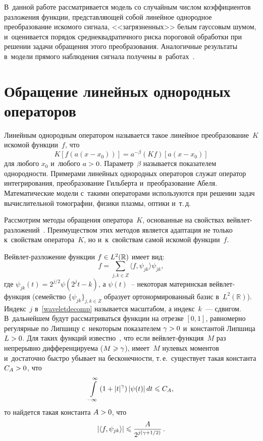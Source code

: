 \begin{multicols}{2}
 В~данной работе рассматривается модель со случайным числом коэффициентов 
 разложения функции, представляющей собой линейное однородное преобразование 
 искомого сигнала, <<загрязненных>> белым гауссовым шумом, и~оценивается 
 порядок среднеквадратичного риска пороговой обработки при решении задачи 
 обращения этого преобразования. Аналогичные результаты в~модели прямого 
 наблюдения сигнала получены в~работах~\cite{SH18, SH19}.


\section{Обращение линейных однородных операторов}

Линейным однородным оператором называется такое линейное преобразование~$K$ 
искомой функции~$f$, что
$$
K\left[f\left(a\left(x-x_0\right)\right)\right]=a^{-\beta}(Kf)\left[a\left(x-x_0\right)\right]
$$
для любого $x_0$ и~любого $a\hm>0$. Параметр~$\beta$ называется показателем 
однородности. Примерами линейных однородных операторов служат оператор 
интегрирования, преобразование Гильберта и~преобразование Абеля. 
Математические модели с~такими операторами используются при решении 
задач вычислительной томографии, физики плазмы, оптики и~т.\,д.

Рассмотрим методы обращения оператора~$K$, основанные на свойствах 
вейв\-лет-раз\-ло\-же\-ний~\cite{D94, AS98}. Преимуществом этих методов 
является адап\-та\-ция не только к~свойствам оператора~$K$, но и~к~свойствам самой 
искомой функции~$f$.

Вейвлет-разложение функции $f\hm\in L^2(\mathbb{R})$ имеет вид:
\begin{equation}                                                              
\label{waveletdecomp}
f = \sum\limits_{j,k\in Z} \langle f,\psi_{jk}\rangle  \psi_{jk},
\end{equation}
где $\psi_{jk}(t)=2^{j/2}\psi(2^jt-k)$, а $\psi(t)$~-- 
некоторая материнская вейв\-лет-функ\-ция (семейство $\{\psi_{jk}\}_{j,k\in Z}$ 
образует ортонормированный базис в~$L^2(\mathbb{R})$). Индекс~$j$ 
в~\eqref{waveletdecomp} называется масштабом, а индекс~$k$~--- сдвигом. 
В~дальнейшем будут рассматриваться функции на отрезке $[0,1]$,
 равномерно регулярные по Липшицу с~некоторым показателем $\gamma\hm>0$ 
 и~константой Липшица $L\hm>0$. Для таких функций известно~\cite{Mall99}, что если 
 вейв\-лет-функ\-ция~$M$ раз непрерывно дифференцируема ($M\hm\geqslant\gamma$), 
 имеет~$M$ нулевых моментов и~достаточно быстро убывает на бесконечности, т.\,е.\
  существует такая константа $C_A\hm>0$, что
$$
\int\limits_{-\infty}^{\infty}\left(
1+\left\vert t\right\vert^{\gamma}\right)\left\vert\psi(t)\right\vert dt\leqslant C_A,$$
то найдется такая константа $A\hm>0$, что 
\begin{equation}                                                                      \label{Coeff_Decay}
\left\vert\langle f, \psi_{jk} \rangle\right\vert \leqslant 
\displaystyle\frac{\displaystyle A\mathstrut}{\displaystyle 2^{j \left( \gamma + 1/2 \right)}\mathstrut}\,.
\end{equation}


\end{multicols}
